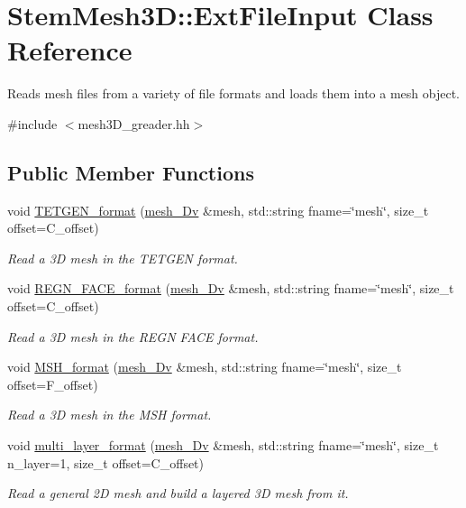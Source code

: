 \hypertarget{classStemMesh3D_1_1ExtFileInput}{}\section{Stem\+Mesh3D\+:\+:Ext\+File\+Input Class Reference}
\label{classStemMesh3D_1_1ExtFileInput}


Reads mesh files from a variety of file formats and loads them into a mesh object.  




{\ttfamily \#include $<$mesh3\+D\+\_\+greader.\+hh$>$}

\subsection*{Public Member Functions}
\begin{DoxyCompactItemize}
\item 
void \hyperlink{classStemMesh3D_1_1ExtFileInput_af553f539c3337a0e8bcdc6140c5b4911}{T\+E\+T\+G\+E\+N\+\_\+format} (\hyperlink{classStemMesh3D_1_1mesh__3Dv}{mesh\+\_\+Dv} \&mesh, std\+::string fname=\char`\"{}mesh\char`\"{}, size\+\_\+t offset=C\+\_\+offset)
\begin{DoxyCompactList}\small\item\em Read a 3D mesh in the T\+E\+T\+G\+EN format. \end{DoxyCompactList}\item 
void \hyperlink{classStemMesh3D_1_1ExtFileInput_ae89dd2d6f641d108ec15b435ba62d62e}{R\+E\+G\+N\+\_\+\+F\+A\+C\+E\+\_\+format} (\hyperlink{classStemMesh3D_1_1mesh__3Dv}{mesh\+\_\+Dv} \&mesh, std\+::string fname=\char`\"{}mesh\char`\"{}, size\+\_\+t offset=C\+\_\+offset)
\begin{DoxyCompactList}\small\item\em Read a 3D mesh in the R\+E\+GN F\+A\+CE format. \end{DoxyCompactList}\item 
void \hyperlink{classStemMesh3D_1_1ExtFileInput_a1a601ea2d05672f64588ac167cfe4a28}{M\+S\+H\+\_\+format} (\hyperlink{classStemMesh3D_1_1mesh__3Dv}{mesh\+\_\+Dv} \&mesh, std\+::string fname=\char`\"{}mesh\char`\"{}, size\+\_\+t offset=F\+\_\+offset)
\begin{DoxyCompactList}\small\item\em Read a 3D mesh in the M\+SH format. \end{DoxyCompactList}\item 
void \hyperlink{classStemMesh3D_1_1ExtFileInput_a54db829a85fd1d52d02e47714949ea16}{multi\+\_\+layer\+\_\+format} (\hyperlink{classStemMesh3D_1_1mesh__3Dv}{mesh\+\_\+Dv} \&mesh, std\+::string fname=\char`\"{}mesh\char`\"{}, size\+\_\+t n\+\_\+layer=1, size\+\_\+t offset=C\+\_\+offset)
\begin{DoxyCompactList}\small\item\em Read a general 2D mesh and build a layered 3D mesh from it. \end{DoxyCompactList}\end{DoxyCompactItemize}


